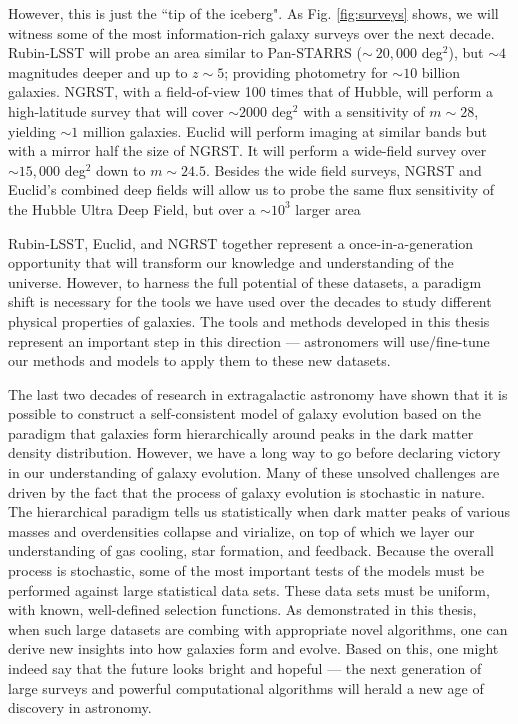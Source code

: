 However, this is just the ``tip of the iceberg". As Fig. \ref{fig:surveys} shows, we will witness some of the most information-rich galaxy surveys over the next decade. Rubin-LSST will probe an area similar to Pan-STARRS ($\sim~20,000$ deg$^2$), but $\sim4$ magnitudes deeper and up to $z\sim5$; providing photometry for $\sim10$ billion galaxies. NGRST, with a field-of-view 100 times that of Hubble, will perform a high-latitude survey that will cover $\sim2000$ deg$^2$ with a sensitivity of $m\sim28$, yielding $\sim1$ million galaxies. Euclid will perform imaging at similar bands but with a mirror half the size of NGRST. It will perform a wide-field survey over $\sim15,000$ deg$^2$ down to $m\sim24.5$. Besides the wide field surveys, NGRST and Euclid’s combined deep fields will allow us to probe the same flux sensitivity of the Hubble Ultra Deep Field, but over a $\sim10^3$ larger area 

Rubin-LSST, Euclid, and NGRST together represent a once-in-a-generation opportunity that will transform our knowledge and understanding of the universe. However, to harness the full potential of these datasets, a paradigm shift is necessary for the tools we have used over the decades to study different physical properties of galaxies. The tools and methods developed in this thesis represent an important step in this direction --- astronomers will use/fine-tune our methods and models to apply them to these new datasets. 

 The last two decades of research in extragalactic astronomy have shown that it is possible to construct a self-consistent model of galaxy evolution based on the paradigm that galaxies form hierarchically around peaks in the dark matter density distribution. However, we have a long way to go before declaring victory in our understanding of galaxy evolution. Many of these unsolved challenges are driven by the fact that the process of galaxy evolution is stochastic in nature. The hierarchical paradigm tells us statistically when dark matter peaks of various masses and overdensities collapse and virialize, on top of which we layer our understanding of gas cooling, star formation, and feedback. Because the overall process is stochastic, some of the most important tests of the models must be performed against large statistical data sets. These data sets must be uniform, with known, well-defined selection functions. As demonstrated in this thesis, when such large datasets are combing with appropriate novel algorithms, one can derive new insights into how galaxies form and evolve. Based on this, one might indeed say that the future looks bright and hopeful --- the next generation of large surveys and powerful computational algorithms will herald a new age of discovery in astronomy. 


